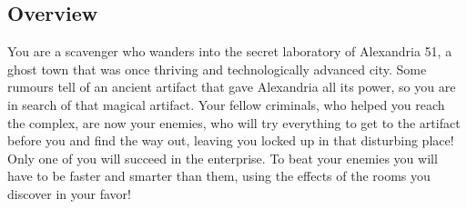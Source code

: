 \subsection{Overview}
You are a scavenger who wanders into the secret laboratory of Alexandria 51, a ghost town that was once thriving and technologically advanced city. Some rumours tell of an ancient artifact that gave Alexandria all its power, so you are in search of that magical artifact. Your fellow criminals, who helped you reach the complex, are now your enemies, who will try everything to get to the artifact before you and find the way out, leaving you locked up in that disturbing place!\\
Only one of you will succeed in the enterprise. To beat your enemies you will have to be faster and smarter than them, using the effects of the rooms you discover in your favor!\\